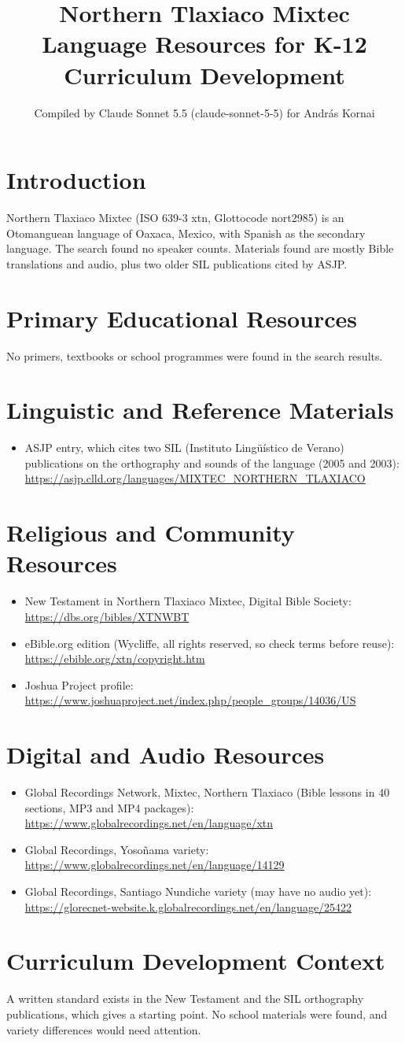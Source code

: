 \documentclass[12pt]{article}
\title{Northern Tlaxiaco Mixtec Language Resources for K-12 Curriculum Development}
\author{Compiled by Claude Sonnet 5.5 (claude-sonnet-5-5) for Andr\'as Kornai}
\date{}
\begin{document}
\maketitle
\section{Introduction}
Northern Tlaxiaco Mixtec (ISO 639-3 xtn, Glottocode nort2985) is an Otomanguean language of Oaxaca, Mexico, with Spanish as the secondary language. The search found no speaker counts. Materials found are mostly Bible translations and audio, plus two older SIL publications cited by ASJP.
\section{Primary Educational Resources}
No primers, textbooks or school programmes were found in the search results.
\section{Linguistic and Reference Materials}
\begin{itemize}
\item ASJP entry, which cites two SIL (Instituto Ling\"u\'istico de Verano) publications on the orthography and sounds of the language (2005 and 2003): \url{https://asjp.clld.org/languages/MIXTEC_NORTHERN_TLAXIACO}
\end{itemize}
\section{Religious and Community Resources}
\begin{itemize}
\item New Testament in Northern Tlaxiaco Mixtec, Digital Bible Society: \url{https://dbs.org/bibles/XTNWBT}
\item eBible.org edition (Wycliffe, all rights reserved, so check terms before reuse): \url{https://ebible.org/xtn/copyright.htm}
\item Joshua Project profile: \url{https://www.joshuaproject.net/index.php/people_groups/14036/US}
\end{itemize}
\section{Digital and Audio Resources}
\begin{itemize}
\item Global Recordings Network, Mixtec, Northern Tlaxiaco (Bible lessons in 40 sections, MP3 and MP4 packages): \url{https://www.globalrecordings.net/en/language/xtn}
\item Global Recordings, Yoso\~nama variety: \url{https://www.globalrecordings.net/en/language/14129}
\item Global Recordings, Santiago Nundiche variety (may have no audio yet): \url{https://glorecnet-website.k.globalrecordings.net/en/language/25422}
\end{itemize}
\section{Curriculum Development Context}
A written standard exists in the New Testament and the SIL orthography publications, which gives a starting point. No school materials were found, and variety differences would need attention.
\end{document}
